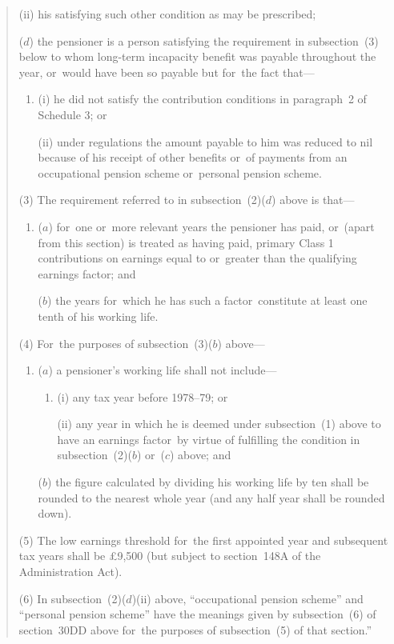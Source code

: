 \documentclass[12pt,a4paper]{article}
\begin{document}
\begin{quotation}
\begin{enumerate}
\begin{enumerate}
(ii) his satisfying such other condition as may be prescribed;
\end{enumerate}

($d$) the pensioner is a person satisfying the requirement in subsection~(3)  below to whom long-term incapacity benefit was payable throughout the year, or~would have been so payable but for~the fact that—
\begin{enumerate}\item[]
(i) he did not satisfy the contribution conditions in paragraph~2 of Schedule 3; or

(ii) under regulations the amount payable to him was reduced to nil because of his receipt of other benefits or~of payments from an occupational pension scheme or~personal pension scheme.
\end{enumerate}
\end{enumerate}

(3) The requirement referred to in subsection~(2)($d$)  above is that—
\begin{enumerate}\item[]
($a$) for~one or~more relevant years the pensioner has paid, or~(apart from this section) is treated as having paid, primary Class 1 contributions on earnings equal to or~greater than the qualifying earnings factor; and

($b$) the years for~which he has such a factor~constitute at least one tenth of his working life.
\end{enumerate}

(4) For~the purposes of subsection~(3)($b$)  above—
\begin{enumerate}\item[]
($a$) a pensioner’s working life shall not include—
\begin{enumerate}\item[]
(i) any tax year before 1978--79; or

(ii) any year in which he is deemed under subsection~(1)  above to have an earnings factor~by virtue of fulfilling the condition in subsection~(2)($b$)  or~($c$)  above; and
\end{enumerate}

($b$) the figure calculated by dividing his working life by ten shall be rounded to the nearest whole year (and any half year shall be rounded down).
\end{enumerate}

(5) The low earnings threshold for~the first appointed year and subsequent tax years shall be £9,500 (but subject to section~148A of the Administration Act).

\begin{sloppypar}
(6) In subsection~(2)($d$)(ii)  above, “occupational pension scheme” and “personal pension scheme” have the meanings given by subsection~(6)  of section~30DD above for~the purposes of subsection~(5)  of that section.”
\end{sloppypar}
\end{quotation}
\end{document}
